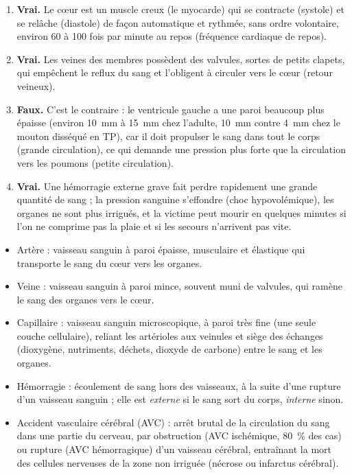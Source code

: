 \documentclass[11pt]{article}
\newcommand{\cle}[1]{{\popxbold\color{popdark}#1}}
\begin{document}
\begin{corrige}
\begin{enumerate}
\item \textbf{Vrai.} Le cœur est un muscle creux (le \cle{myocarde}) qui se contracte (\cle{systole}) et se relâche (\cle{diastole}) de façon automatique et rythmée, sans ordre volontaire, environ 60 à 100 fois par minute au repos (fréquence cardiaque de repos).
\item \textbf{Vrai.} Les veines des membres possèdent des \cle{valvules}, sortes de petits clapets, qui empêchent le reflux du sang et l'obligent à circuler vers le cœur (retour veineux).
\item \textbf{Faux.} C'est le contraire : le ventricule gauche a une paroi beaucoup plus épaisse (environ \SI{10}{\milli\meter} à \SI{15}{\milli\meter} chez l'adulte, \SI{10}{\milli\meter} contre \SI{4}{\milli\meter} chez le mouton disséqué en TP), car il doit propulser le sang dans tout le corps (grande circulation), ce qui demande une pression plus forte que la circulation vers les poumons (petite circulation).
\item \textbf{Vrai.} Une hémorragie externe grave fait perdre rapidement une grande quantité de sang ; la pression sanguine s'effondre (\cle{choc hypovolémique}), les organes ne sont plus irrigués, et la victime peut mourir en quelques minutes si l'on ne comprime pas la plaie et si les secours n'arrivent pas vite.
\end{enumerate}
\end{corrige}

\begin{corrige}
\begin{itemize}
\item \cle{Artère} : vaisseau sanguin à paroi épaisse, musculaire et élastique qui transporte le sang du cœur vers les organes.
\item \cle{Veine} : vaisseau sanguin à paroi mince, souvent muni de valvules, qui ramène le sang des organes vers le cœur.
\item \cle{Capillaire} : vaisseau sanguin microscopique, à paroi très fine (une seule couche cellulaire), reliant les artérioles aux veinules et siège des échanges (dioxygène, nutriments, déchets, dioxyde de carbone) entre le sang et les organes.
\item \cle{Hémorragie} : écoulement de sang hors des vaisseaux, à la suite d'une rupture d'un vaisseau sanguin ; elle est \emph{externe} si le sang sort du corps, \emph{interne} sinon.
\item \cle{Accident vasculaire cérébral (AVC)} : arrêt brutal de la circulation du sang dans une partie du cerveau, par obstruction (AVC ischémique, \SI{80}{\%} des cas) ou rupture (AVC hémorragique) d'un vaisseau cérébral, entraînant la mort des cellules nerveuses de la zone non irriguée (\cle{nécrose} ou infarctus cérébral).
\end{itemize}
\end{corrige}
\end{document}
